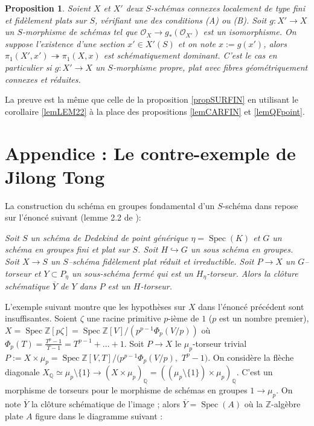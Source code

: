 \documentclass[11pt]{amsart}
\numberwithin{equation}{section}
\newtheorem{prop}[thm]{Proposition}
\theoremstyle{definition}
\theoremstyle{remark}
\newcommand{\bQ}{{\mathbb Q}}
\newcommand{\bZ}{{\mathbb Z}}
\newcommand{\dO}{{\mathcal O}}
\DeclareMathOperator{\Spec}{Spec}
\begin{document}
\begin{prop}\label{propFIBGEO1} Soient $X$ et $X'$ deux $S$-sch\'emas connexes localement de type fini et fid\`element plats sur $S$, v\'erifiant une des conditions (A) ou (B). Soit $g:X'\to X$ un $S$-morphisme de sch\'emas tel que $\dO_X\to g_* (\dO_{X'})$ est un isomorphisme. On suppose l'existence d'une section $x'\in X'(S)$ et on note $x:=g(x')$, alors $\pi_1(X',x') \twoheadrightarrow  \pi_1(X,x)   $ est sch\'ematiquement dominant. C'est le cas en particulier si $g : X' \to X$ un $S$-morphisme propre, plat avec fibres g\'eom\'etriquement connexes et r\'eduites.
\end{prop}
\proof La preuve est la m\^eme que celle de la proposition \ref{propSURFIN} en utilisant le corollaire \ref{lemLEM22} \`a la place des propositions \ref{lemCARFIN} et \ref{lemQFpoint}.\endproof


\section{Appendice : Le contre-exemple de Jilong Tong}
\label{sezJIL}

La construction du sch\'ema en groupes fondamental d'un $S$-sch\'ema dans  \cite{GAS} repose sur l'\'enonc\'e suivant (lemme 2.2 de \cite{GAS}):


\smallskip

{\it Soit $S$ un sch\'ema de Dedekind de point g\'en\'erique $\eta=\Spec(K)$ et $G$ un sch\'ema en groupes fini et plat sur $S$. Soit $H\hookrightarrow G$ un sous sch\'ema en groupes. Soit $X\to S$ un $S$--sch\'ema fid\`element  plat {\it r\'eduit} et irreductible. Soit $P\to X$ un $G$--torseur et $Y\subset P_\eta$ un sous-sch\'ema ferm\'e qui est un $H_\eta$-torseur.  Alors la cl\^oture sch\'ematique $\overline Y$ de $Y$ dans $P$ est un $H$-torseur.}

\smallskip

L'exemple suivant montre que les hypoth\`eses sur $X$ dans l'\'enonc\'e pr\'ec\'edent sont insuffisantes. Soient
$\zeta $ une racine primitive $p$-i\`eme de $1$ ($p$ est un nombre premier), $X = \Spec \bZ [p\zeta ]= \Spec \bZ [V] /(p^{p-1}\Phi _p (V/p))$ o\`u $\Phi _p (T)= {\frac{T^p -1}{T-1}}=T^{p-1} + \dots +1$. Soit $P\to X$ le $\mu _p$-torseur trivial $P:=X \times \mu _p = \Spec \bZ [V,T]/( p^{p-1}\Phi _p (V/p),$ $T^p -1)$. On consid\`ere la fl\`eche diagonale $X_{\bQ}\simeq \mu _p \setminus \{ 1 \}  \to (X \times \mu _p) _{\bQ} = ((\mu _p \setminus \{ 1 \} ) \times \mu _p) _{\bQ}$. C'est un morphisme de torseurs pour le morphisme de sch\'emas en groupes $1 \to \mu _p$. On note $\overline Y$ la cl\^oture sch\'ematique de l'image ; alors $\overline Y= \Spec (A)$ o\`u la $\bZ $-alg\`ebre plate $A$ figure dans le diagramme suivant :
\end{document}
